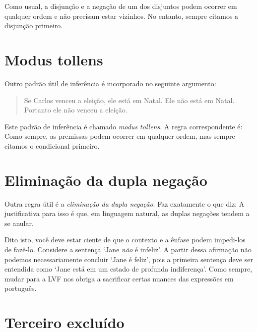 Como usual, a disjun\c c\~ao e a nega\c c\~ao de um dos disjuntos podem ocorrer em qualquer ordem e n\~ao precisam estar vizinhos. %
No entanto, sempre citamos a disjun\c c\~ao primeiro.

\section{Modus tollens}
Outro padr\~ao  \'util de infer\^encia \'e incorporado no seguinte argumento:
	\begin{quote}
		Se Carlos venceu a elei\c c\~ao, ele est\'a em Natal. Ele n\~ao est\'a em Natal. Portanto ele n\~ao venceu a elei\c c\~ao.
	\end{quote}
Este padr\~ao de infer\^encia \'e chamado \emph{modus tollens}. A regra correspondente \'e:
Como sempre, as premissas podem ocorrer em qualquer ordem, mas sempre citamos o condicional primeiro. 

\section{Elimina\c c\~ao da dupla nega\c c\~ao}
Outra regra  \'util \'e a  \emph{elimina\c c\~ao da dupla nega\c c\~ao}. Faz exatamente o que diz:
A justificativa para isso \'e que, em linguagem natural, as duplas nega\c c\~oes tendem a se anular.

Dito isto, você deve estar ciente de que o contexto e a ênfase podem impedi-los de fazê-lo. Considere a senten\c ca `Jane \emph{n\~ao} \'e infeliz’.  A partir dessa afirma\c c\~ao  n\~ao podemos necessariamente concluir `Jane \'e feliz’, pois a primeira senten\c ca deve ser entendida como  `Jane est\'a em um estado de profunda indiferen\c ca’. 
  Como sempre, mudar para a LVF nos obriga a sacrificar certas nuances das express\~oes em portugu\^es. 

\section{Terceiro exclu\'ido}

